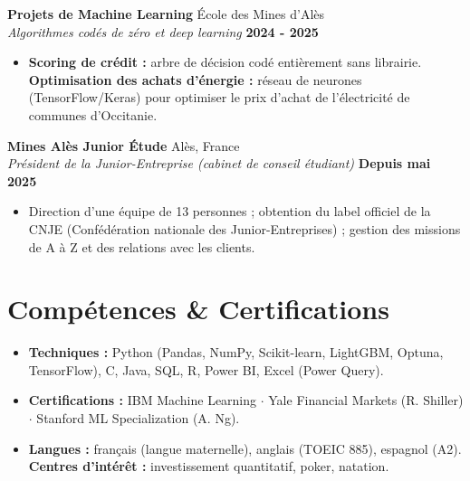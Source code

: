 \documentclass[a4paper,10pt]{article}
\newcommand{\cventry}[4]{
    \vspace{2pt}
    \noindent \textbf{#1} \hfill #2 \\
    \noindent \textit{#3} \hfill \textbf{#4}
}
\newenvironment{cvbullets}{
    \begin{itemize}[itemsep=1.5pt, topsep=2pt, leftmargin=1.1em, label=\tiny$\bullet$]
}{
    \end{itemize} \vspace{1pt}
}
\begin{document}
\cventry{Projets de Machine Learning}{École des Mines d'Alès}{Algorithmes codés de zéro et deep learning}{2024 - 2025}
\begin{cvbullets}
    \item \textbf{Scoring de crédit :} arbre de décision codé entièrement sans librairie. \textbf{Optimisation des achats d'énergie :} réseau de neurones (TensorFlow/Keras) pour optimiser le prix d'achat de l'électricité de communes d'Occitanie.
\end{cvbullets}

\cventry{Mines Alès Junior Étude}{Alès, France}{Président de la Junior-Entreprise (cabinet de conseil étudiant)}{Depuis mai 2025}
\begin{cvbullets}
    \item Direction d'une équipe de 13 personnes ; obtention du label officiel de la CNJE (Confédération nationale des Junior-Entreprises) ; gestion des missions de A à Z et des relations avec les clients.
\end{cvbullets}

\section{Compétences \& Certifications}

\begin{itemize}[itemsep=1.5pt, topsep=2pt, leftmargin=1.1em, label=\tiny$\bullet$]
    \item \textbf{Techniques :} Python (Pandas, NumPy, Scikit-learn, LightGBM, Optuna, TensorFlow), C, Java, SQL, R, Power BI, Excel (Power Query).
    \item \textbf{Certifications :} IBM Machine Learning $\cdot$ Yale Financial Markets (R. Shiller) $\cdot$ Stanford ML Specialization (A. Ng).
    \item \textbf{Langues :} français (langue maternelle), anglais (TOEIC 885), espagnol (A2). \quad \textbf{Centres d'intérêt :} investissement quantitatif, poker, natation.
\end{itemize}
\end{document}
